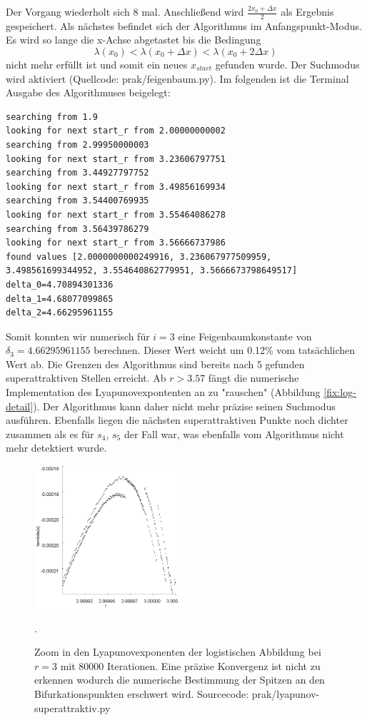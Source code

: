 \documentclass[12pt,a4paper]{article}
\begin{document}
Der Vorgang wiederholt sich 8 mal. Anschließend wird $\frac{2x_0 + \Delta x}{2}$ als Ergebnis gespeichert. 
Als nächstes befindet sich der Algorithmus im Anfangspunkt-Modus. Es wird so lange die x-Achse abgetastet bis die Bedingung 
\begin{equation}
\lambda(x_0) < \lambda(x_0 + \Delta x) < \lambda(x_0 + 2\Delta x)
\end{equation}
nicht mehr erfüllt ist und somit ein neues $x_{start}$ gefunden wurde. Der Suchmodus wird aktiviert  (Quellcode: prak/feigenbaum.py).
Im folgenden ist die Terminal Ausgabe des Algorithmuses beigelegt:
\begin{lstlisting}
searching from 1.9
looking for next start_r from 2.00000000002
searching from 2.99950000003
looking for next start_r from 3.23606797751
searching from 3.44927797752
looking for next start_r from 3.49856169934
searching from 3.54400769935
looking for next start_r from 3.55464086278
searching from 3.56439786279
looking for next start_r from 3.56666737986
found values [2.0000000000249916, 3.236067977509959, 3.498561699344952, 3.554640862779951, 3.5666673798649517]
delta_0=4.70894301336
delta_1=4.68077099865
delta_2=4.66295961155
\end{lstlisting}
Somit konnten wir numerisch für $i=3$ eine Feigenbaumkonstante von $\delta_3=4.66295961155$ berechnen. Dieser Wert weicht um 0.12\% vom tatsächlichen Wert ab. Die Grenzen des Algorithmus sind bereits nach 5 gefunden superattraktiven Stellen erreicht. Ab $r>3.57$ fängt die numerische Implementation des Lyapunovexpontenten an zu "rauschen" (Abbildung \ref{fix:log-detail}). Der Algorithmus kann daher nicht mehr präzise seinen Suchmodus ausführen. Ebenfalls liegen die nächsten superattraktiven Punkte noch dichter zusammen als es für $s_4$, $s_5$ der Fall war, was ebenfalls vom Algorithmus nicht mehr detektiert wurde. 
\begin{figure}
\centering
\includegraphics[height=200px]{lya-rauschen}
\caption{Zoom in den Lyapunovexponenten der logistischen Abbildung bei $r=3$ mit 80000 Iterationen. 
Eine präzise Konvergenz ist nicht zu erkennen wodurch die numerische Bestimmung der Spitzen an den Bifurkationspunkten erschwert wird. Sourcecode: prak/lyapunov-superattraktiv.py}. 
\label{fig:lya-rauschen}
\end{figure}
\end{document}
